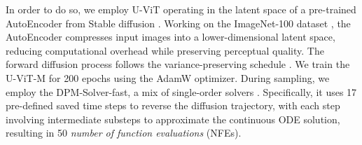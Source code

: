 In order to do so, 
we employ U-ViT \citep{bao2022all} operating in the latent space of a pre-trained AutoEncoder from Stable diffusion \citep{rombach2021highresolution}. Working on the ImageNet-100 dataset \citep{deng2009imagenet}, the AutoEncoder compresses input images into a lower-dimensional latent space, reducing computational overhead while preserving perceptual quality. The forward diffusion process follows the variance-preserving schedule \citep{DiffusionModels3}. We train the U-ViT-M for 200 epochs using the AdamW optimizer.  
During sampling, we employ the DPM-Solver-fast, a mix of single-order solvers \citep{lu2022dpm}. 
Specifically, it uses 17 pre-defined saved time steps to reverse the diffusion trajectory, with each step involving intermediate substeps to approximate the continuous ODE solution, resulting in 50 \emph{number of function evaluations} (NFEs). 

